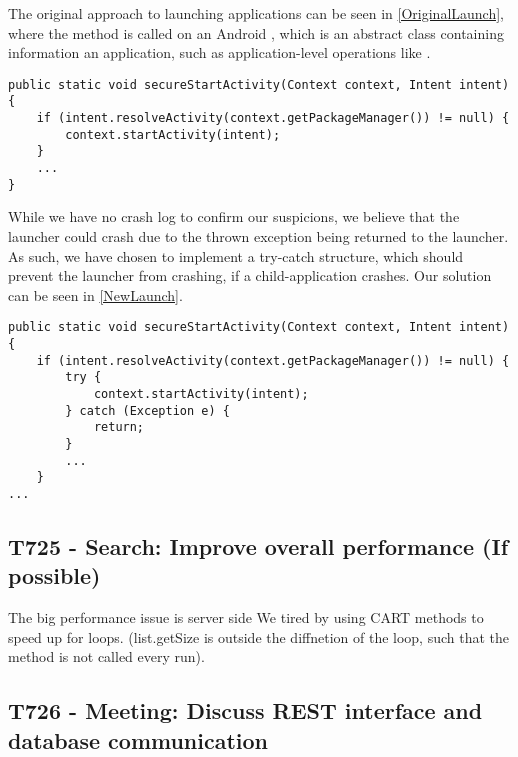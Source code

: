 The original approach to launching applications can be seen in
\autoref{OriginalLaunch}, where the  method is called on an
Android , which is an abstract class containing information an
application, such as application-level operations like
.\nl

\begin{minipage}[H]{\linewidth}
\begin{lstlisting}[caption = Original approach to launching applications., label = OriginalLaunch]
public static void secureStartActivity(Context context, Intent intent) {
	if (intent.resolveActivity(context.getPackageManager()) != null) {	
    	context.startActivity(intent);
	}
	...
}
\end{lstlisting}
\end{minipage}

While we have no crash log to confirm our suspicions, we believe that the
launcher could crash due to the thrown exception being returned to the launcher.
As such, we have chosen to implement a try-catch structure, which should prevent
the launcher from crashing, if a child-application crashes. Our solution can be 
seen in \autoref{NewLaunch}.\nl

\begin{minipage}[H]{\linewidth}
\begin{lstlisting}[caption = New approach to launching applications., label = NewLaunch] 
public static void secureStartActivity(Context context, Intent intent) {
	if (intent.resolveActivity(context.getPackageManager()) != null) {
    	try {
        	context.startActivity(intent);
        } catch (Exception e) {
        	return;
        }
        ...
    }
...
\end{lstlisting}
\end{minipage}

\subsection{T725 - Search: Improve overall performance (If possible)}
The big performance issue is server side
We tired by using CART methods to speed up for loops. (list.getSize is outside
the diffnetion of the loop, such that the method is not called every run).

\subsection{T726 - Meeting: Discuss REST interface and database communication}


